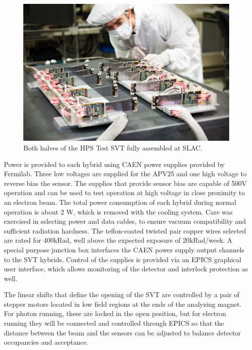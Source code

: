 \begin{figure}[ht]
    \includegraphics[width=\textwidth]{test2012/2012-101-PHOTON-DETECTOR-001.jpg}
\caption{\small{Both halves of the HPS Test SVT fully assembled at SLAC.} }
\label{fig:tracker_halves}
\end{figure}

Power is provided to each hybrid using CAEN power supplies provided by Fermilab. Three low voltages are supplied for the APV25 and one high voltage to reverse bias the sensor. The supplies that provide sensor bias are capable of 500V operation and can be used to test operation at high voltage in close proximity to an electron beam. The total power consumption of each hybrid during normal operation is about 2 W, which is removed with the cooling system. Care was exercised in selecting power and data cables, to ensure vacuum compatibility and sufficient radiation hardness. The teflon-coated twisted pair copper wires selected are rated for 400kRad, well above the expected exposure of 20kRad/week. A special purpose junction box interfaces the CAEN power supply output channels to the SVT hybrids. Control of the supplies is provided via an EPICS graphical user interface, which allows monitoring of the detector and interlock protection as well.

The linear shifts that define the opening of the SVT are controlled by a pair of stepper motors located in low field regions at the ends of the analyzing magnet.  For photon running, these are locked in the open position, but for electron running they will be connected and controlled through EPICS so that the distance between the beam and the sensors can be adjusted to balance detector occupancies and acceptance.


